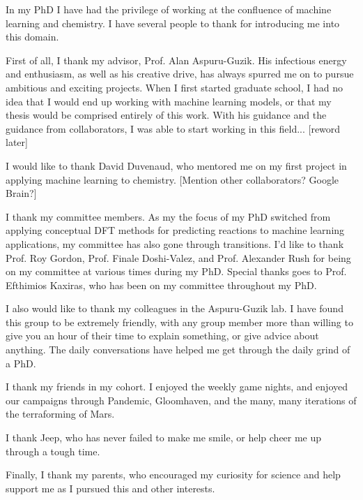 In my PhD I have had the privilege of working at the confluence of machine learning and chemistry. I have several people to thank for introducing me into this domain.



First of all, I thank my advisor, Prof. Alan Aspuru-Guzik. His infectious energy and enthusiasm, as well as his creative drive, has always spurred me on to pursue ambitious and exciting projects. When I first started graduate school, I had no idea that I would end up working with machine learning models, or that my thesis would be comprised entirely of this work. With his guidance and the guidance from collaborators, I was able to start working in this field... [reword later]



I would like to thank David Duvenaud, who mentored me on my first project in applying machine learning to chemistry. [Mention other collaborators? Google Brain?]



I thank my committee members. As my the focus of my PhD switched from applying conceptual DFT methods for predicting reactions to machine learning applications, my committee has also gone through transitions. I'd like to thank Prof. Roy Gordon, Prof. Finale Doshi-Valez, and Prof. Alexander Rush for being on my committee at various times during my PhD. Special thanks goes to Prof. Efthimios Kaxiras, who has been on my committee throughout my PhD.



I also would like to thank my colleagues in the Aspuru-Guzik lab. I have found this group to be extremely friendly, with any group member more than willing to give you an hour of their time to explain something, or give advice about anything. The daily conversations have helped me get through the daily grind of a PhD.



I thank my friends in my cohort. I enjoyed the weekly game nights, and enjoyed our campaigns through Pandemic, Gloomhaven, and the many, many iterations of the terraforming of Mars. 



I thank Jeep, who has never failed to make me smile, or help cheer me up through a tough time.



Finally, I thank my parents, who encouraged my curiosity for science and help support me as I pursued this and other interests.
